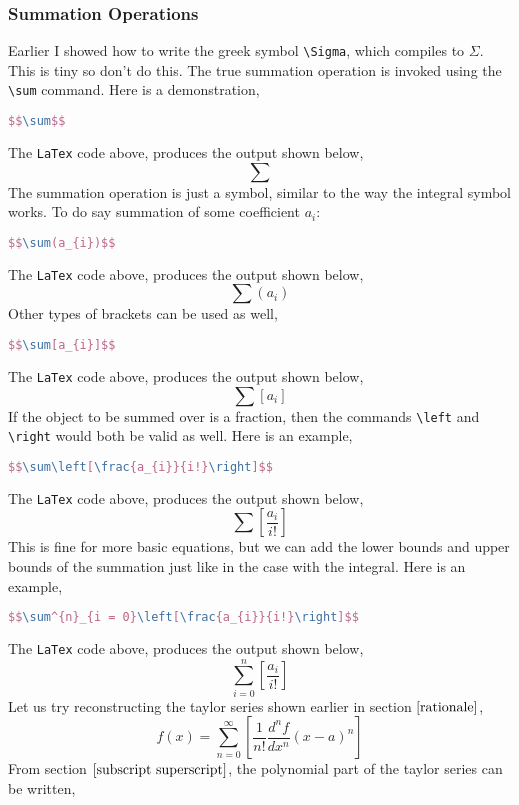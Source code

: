 \documentclass[a4paper, 12pt]{report}
\begin{document}
\begin{center}
\subsubsection{Summation Operations}
\begin{comment}
\end{comment}
Earlier I showed how to write the greek symbol \texttt{\textbackslash Sigma}, which compiles to $\Sigma$. This is tiny so don't do this. The true summation operation is invoked using the \texttt{\textbackslash sum} command. Here is a demonstration,
\begin{lstlisting}[language=tex]
$$\sum$$
\end{lstlisting}
The \texttt{LaTex} code above, produces the output shown below,
$$\sum$$
The summation operation is just a symbol, similar to the way the integral symbol works. To do say summation of some coefficient $a_{i}$:
\begin{lstlisting}[language=tex]
$$\sum(a_{i})$$
\end{lstlisting}
The \texttt{LaTex} code above, produces the output shown below,
$$\sum(a_{i})$$
Other types of brackets can be used as well,
\begin{lstlisting}[language=tex]
$$\sum[a_{i}]$$
\end{lstlisting}
The \texttt{LaTex} code above, produces the output shown below,
$$\sum[a_{i}]$$
If the object to be summed over is a fraction, then the commands \texttt{\textbackslash left} and \texttt{\textbackslash right} would both be valid as well. Here is an example,
\begin{lstlisting}[language=tex]
$$\sum\left[\frac{a_{i}}{i!}\right]$$
\end{lstlisting}
The \texttt{LaTex} code above, produces the output shown below,
$$\sum\left[\frac{a_{i}}{i!}\right]$$
This is fine for more basic equations, but we can add the lower bounds and upper bounds of the summation just like in the case with the integral. Here is an example,
\begin{lstlisting}[language=tex]
$$\sum^{n}_{i = 0}\left[\frac{a_{i}}{i!}\right]$$
\end{lstlisting}
The \texttt{LaTex} code above, produces the output shown below,
$$\sum^{n}_{i = 0}\left[\frac{a_{i}}{i!}\right]$$
Let us try reconstructing the taylor series shown earlier in section $\ref{rationale}$,
$$f(x) = \sum^{\infty}_{n = 0}\left[\frac{1}{n!}\frac{d^{n}f}{dx^{n}}(x-a)^{n}\right]$$
From section $\ref{subscript superscript}$, the polynomial part of the taylor series can be written,

\end{center}
\end{document}
